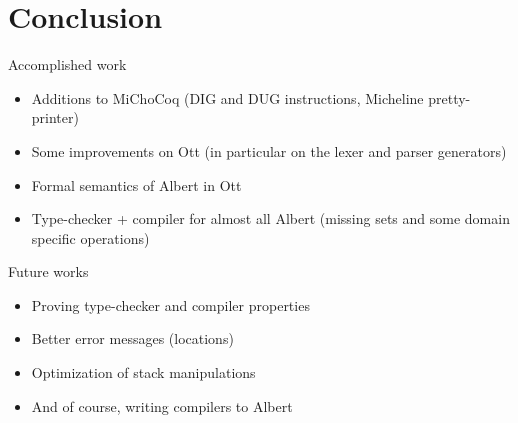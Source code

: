 \documentclass[aspectratio=169]{beamer}
\begin{document}

\section{Conclusion}

\begin{frame}{Accomplished work}
  \begin{itemize}
  \item Additions to MiChoCoq (DIG and DUG instructions, Micheline pretty-printer)
  \item Some improvements on Ott (in particular on the lexer and parser generators)
  \item Formal semantics of Albert in Ott
  \item Type-checker + compiler for almost all Albert (missing sets and some domain specific operations)
  \end{itemize}
\end{frame}

\begin{frame}{Future works}
  \begin{itemize}
  \item Proving type-checker and compiler properties
  \item Better error messages (locations)
  \item Optimization of stack manipulations
  \item And of course, writing compilers to Albert
  \end{itemize}
\end{frame}
\end{document}
